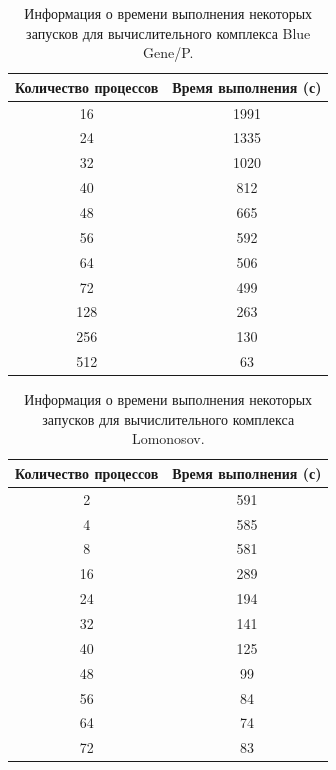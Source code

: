 \documentclass[a4paper,12pt]{report}
\begin{document}
			\begin{table}[H]
				\centering
				\begin{tabular}{|c|c|}
					\hline
					Количество процессов & Время выполнения (с)\\
					\hline
					\hline
					16 & 1991\\
					\hline
					24 & 1335\\
					\hline
					32 & 1020\\
					\hline
					40 & 812\\
					\hline
					48 & 665\\
					\hline
					56 & 592\\
					\hline
					64 & 506\\
					\hline
					72 & 499\\
					\hline
					128 & 263\\
					\hline
					256 & 130\\
					\hline
					512 & 63\\
					\hline

				\end{tabular}
				\caption{Информация о времени выполнения некоторых запусков для вычислительного комплекса Blue Gene/P.}
				\label{res}
			\end{table}

			\begin{table}[H]
				\centering
				\begin{tabular}{|c|c|}
					\hline
					Количество процессов & Время выполнения (с)\\
					\hline
					\hline
					2 & 591\\
					\hline
					4 & 585\\
					\hline
					8 & 581\\
					\hline
					16 & 289\\
					\hline
					24 & 194\\
					\hline
					32 & 141\\
					\hline
					40 & 125\\
					\hline
					48 & 99\\
					\hline
					56 & 84\\
					\hline
					64 & 74\\
					\hline
					72 & 83\\
					\hline
					
				\end{tabular}
				\caption{Информация о времени выполнения некоторых запусков для вычислительного комплекса Lomonosov.}
				\label{res}
			\end{table}
\end{document}
